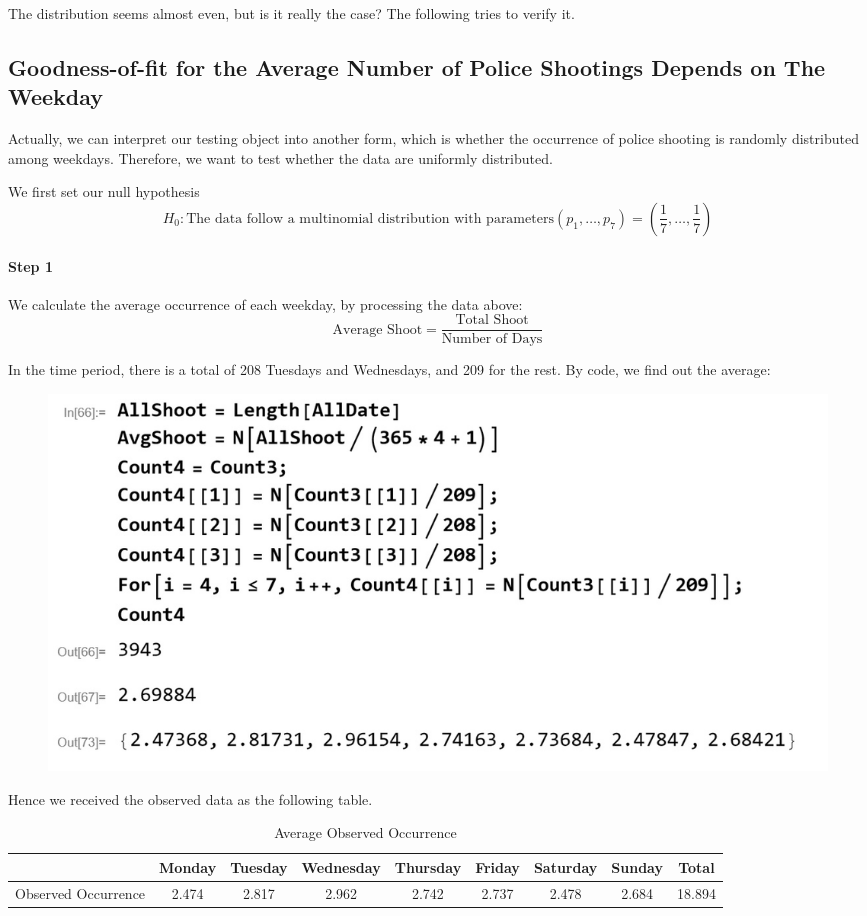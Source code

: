 \documentclass[a4paper]{article}
\begin{document}
The distribution seems almost even, but is it really the case? The following tries to verify it.
\subsection{Goodness-of-fit for the Average Number of Police Shootings Depends on The Weekday}
Actually, we can interpret our testing object into another form, which is whether the occurrence of police shooting is randomly distributed among weekdays. Therefore, we want to test whether the data are uniformly distributed.

We first set our null hypothesis
\begin{equation*}
H_0: \text{The data follow a multinomial distribution with parameters} \left( p _ { 1 } , \ldots , p _ { 7 } \right) = \left( \frac { 1 } { 7 } , \ldots , \frac { 1 } { 7 } \right)
\end{equation*}

\paragraph{Step 1} We calculate the average occurrence of each weekday, by processing the data above:
$$\text{Average Shoot} = \frac{\text{Total Shoot}}{\text{Number of Days}}$$

In the time period, there is a total of 208 Tuesdays and Wednesdays, and 209 for the rest. By code, we find out the average:

\newpage

\begin{figure}[!htbp]
\centering
\includegraphics[width=0.8\linewidth]{dataprocess5.jpg}
\end{figure}

Hence we received the observed data as the following table.

\begin{table}[!htbp]
\centering
\begin{tabular}{c|ccccccc|c}
                    & Monday  & Tuesday & Wednesday & Thursday & Friday  & Saturday & Sunday  & Total \\ \hline
Observed Occurrence & 2.474     & 2.817     & 2.962       & 2.742      & 2.737     & 2.478      & 2.684     & 18.894  \\ 
\end{tabular}
\caption{Average Observed Occurrence}
\end{table}
\end{document}
